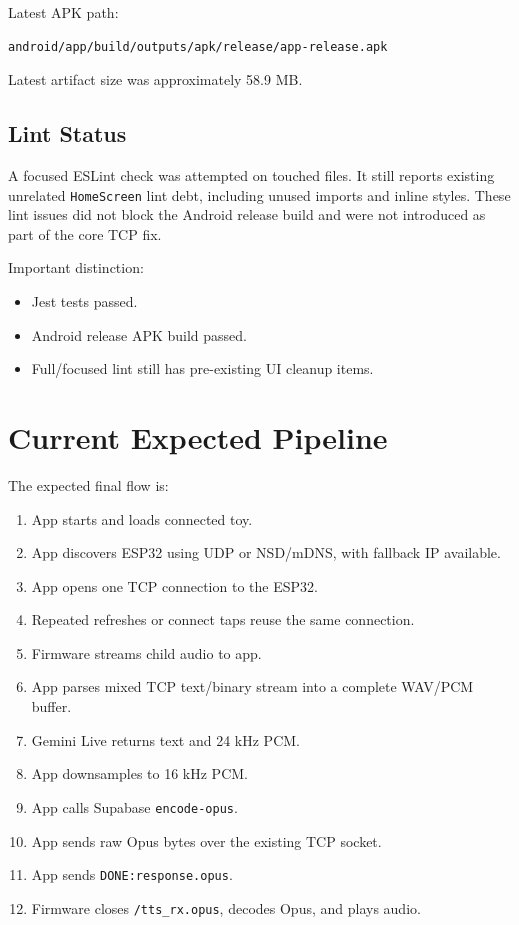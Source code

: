 \documentclass[11pt,a4paper]{article}
\begin{document}
Latest APK path:

\begin{lstlisting}[style=logstyle]
android/app/build/outputs/apk/release/app-release.apk
\end{lstlisting}

Latest artifact size was approximately 58.9 MB.

\subsection{Lint Status}

A focused ESLint check was attempted on touched files. It still reports existing unrelated \texttt{HomeScreen} lint debt, including unused imports and inline styles. These lint issues did not block the Android release build and were not introduced as part of the core TCP fix.

Important distinction:

\begin{itemize}[leftmargin=*]
  \item Jest tests passed.
  \item Android release APK build passed.
  \item Full/focused lint still has pre-existing UI cleanup items.
\end{itemize}

\section{Current Expected Pipeline}

The expected final flow is:

\begin{enumerate}[leftmargin=*]
  \item App starts and loads connected toy.
  \item App discovers ESP32 using UDP or NSD/mDNS, with fallback IP available.
  \item App opens one TCP connection to the ESP32.
  \item Repeated refreshes or connect taps reuse the same connection.
  \item Firmware streams child audio to app.
  \item App parses mixed TCP text/binary stream into a complete WAV/PCM buffer.
  \item Gemini Live returns text and 24 kHz PCM.
  \item App downsamples to 16 kHz PCM.
  \item App calls Supabase \texttt{encode-opus}.
  \item App sends raw Opus bytes over the existing TCP socket.
  \item App sends \texttt{DONE:response.opus}.
  \item Firmware closes \texttt{/tts\_rx.opus}, decodes Opus, and plays audio.
\end{enumerate}
\end{document}
